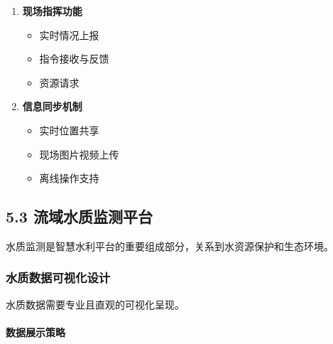\begin{enumerate}
\def\labelenumi{\arabic{enumi}.}
\tightlist
\item
  \textbf{现场指挥功能}

  \begin{itemize}
  \tightlist
  \item
    实时情况上报
  \item
    指令接收与反馈
  \item
    资源请求
  \end{itemize}
\item
  \textbf{信息同步机制}

  \begin{itemize}
  \tightlist
  \item
    实时位置共享
  \item
    现场图片视频上传
  \item
    离线操作支持
  \end{itemize}
\end{enumerate}

\subsection{5.3
流域水质监测平台}\label{ux6d41ux57dfux6c34ux8d28ux76d1ux6d4bux5e73ux53f0}

水质监测是智慧水利平台的重要组成部分，关系到水资源保护和生态环境。

\subsubsection{水质数据可视化设计}\label{ux6c34ux8d28ux6570ux636eux53efux89c6ux5316ux8bbeux8ba1}

水质数据需要专业且直观的可视化呈现。

\paragraph{数据展示策略}\label{ux6570ux636eux5c55ux793aux7b56ux7565}


